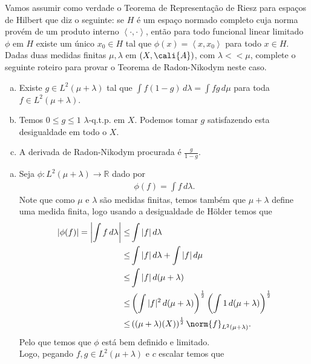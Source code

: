 \begin{homeworkProblem}[7]
  Vamos assumir como verdade o Teorema de Representação de Riesz para espaços de Hilbert que diz o seguinte: se $H$ é um espaço normado completo cuja norma provém de um produto interno $\left\langle \cdot,\cdot \right\rangle$, então para todo funcional linear limitado $\phi$ em $H$ existe um único $x_0\in H$ tal que $\phi(x)=\left\langle x,x_0 \right\rangle$ para todo $x\in H$. Dadas duas medidas finitas $\mu,\lambda$ em $(X,\cali{A})$, com $\lambda<<\mu$, complete o seguinte roteiro para provar o Teorema de Radon-Nikodym neste caso.
  \begin{enumerate}[a)]
    \item Existe $g\in L^{2}(\mu+\lambda)$ tal que $\int f(1-g)\,d\lambda=\int fg\,d\mu$ para toda $f\in L^{2}(\mu+\lambda)$.
    \item Temos $0\leq g\leq 1$ $\lambda$-q.t.p. em $X$. Podemos tomar $g$ satisfazendo esta desigualdade em todo o $X$.
    \item A derivada de Radon-Nikodym procurada é $\frac{g}{1-g}$.
  \end{enumerate}
  \begin{solution}
  \begin{enumerate}[a)]
    \item Seja $\phi:L^{2}(\mu+\lambda)\to\mathbb{R}$ dado por 
      \begin{align*}
        \phi(f)=\int f\,d\lambda.
      \end{align*}
      Note que como $\mu$ e $\lambda$ são medidas finitas, temos também que $\mu+\lambda$ define uma medida finita, logo usando a desigualdade de Hölder temos que
      \begin{align*}
        \left| \phi(f) \right|=\left| \int f\,d\lambda \right|\leq& \int|f|\,d\lambda\\
        \leq& \int |f|\,d\lambda + \int |f|\,d\mu\\
        \leq& \int |f|\,d(\mu+\lambda)\\
        \leq& \left( \int |f|^2\,d(\mu+\lambda) \right)^{\frac{1}{2}}\left( \int 1\,d(\mu+\lambda) \right)^{\frac{1}{2}}\\
        \leq& \left( (\mu+\lambda)(X) \right)^{\frac{1}{2}}\norm{f}_{L^{2}(\mu+\lambda)}.
      \end{align*}
      Pelo que temos que $\phi$ está bem definido e limitado.\\
      Logo, pegando $f,g\in L^{2}(\mu+\lambda)$ e $c$ escalar temos que
      \begin{align*}

\end{align*}
\end{enumerate}
\end{solution}
\end{homeworkProblem}
